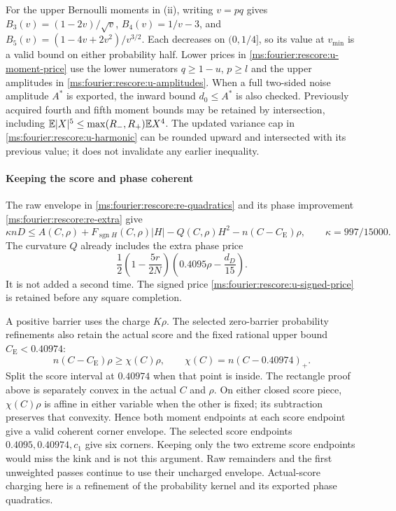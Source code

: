 For the upper Bernoulli moments in (ii), writing $v=pq$ gives
$B_3(v)=(1-2v)/\sqrt v$, $B_4(v)=1/v-3$, and
$B_5(v)=(1-4v+2v^2)/v^{3/2}$.  Each decreases on $(0,1/4]$, so its
value at $v_{\min}$ is a valid bound on either probability half.
Lower prices in \eqref{ms:fourier:rescore:u-moment-price} use the lower numerators
$q\ge1-u$, $p\ge l$ and the upper amplitudes in
\eqref{ms:fourier:rescore:u-amplitudes}.  When a full two-sided noise amplitude $A^*$ is
exported, the inward bound $d_0\le A^*$ is also checked.
Previously acquired fourth and fifth moment bounds may be retained by
intersection, including $\mathbb E|X|^5\le
\max(R_-,R_+)\mathbb E X^4$.  The updated variance cap in
\eqref{ms:fourier:rescore:u-harmonic} can be rounded upward and intersected with its
previous value; it does not invalidate any earlier inequality.

\paragraph{Keeping the score and phase coherent}\label{ms:fourier:rescore:u-phase}

The raw envelope in \eqref{ms:fourier:rescore:re-quadratics} and its phase
improvement \eqref{ms:fourier:rescore:re-extra} give
\begin{equation}\label{ms:fourier:rescore:u-conserved}
 \kappa nD\le A(C,\rho)+F_{\operatorname{sgn}H}(C,\rho)|H|
       -Q(C,\rho)H^2-n(C-C_{\mathrm E})\rho,
 \qquad\kappa=997/15000.
\end{equation}
The curvature $Q$ already includes the extra phase price
\[
 \frac12\left(1-\frac{5r}{2N}\right)
                   \left(0.4095\rho-\frac{d_D}{15}\right).
\]
It is not added a second time.  The signed price
\eqref{ms:fourier:rescore:u-signed-price} is retained before any square completion.

A positive barrier uses the charge $K\rho$.  The selected
zero-barrier probability refinements also retain the actual score and
the fixed rational upper bound $C_{\mathrm E}<0.40974$:
\begin{equation}\label{ms:fourier:rescore:u-actual-charge}
 n(C-C_{\mathrm E})\rho\ge\chi(C)\rho,
 \qquad\chi(C)=n(C-0.40974)_+.
\end{equation}
Split the score interval at $0.40974$ when that point is inside.
The rectangle proof above is separately convex in the
actual $C$ and $\rho$.  On either closed score piece,
$\chi(C)\rho$ is affine in either variable when the other is fixed;
its subtraction preserves that convexity.  Hence both moment endpoints
at each score endpoint give a valid coherent corner envelope.
The selected score endpoints $0.4095,0.40974,c_1$ give six
corners.  Keeping only the two extreme score endpoints would miss the
kink and is not this argument. Raw remainders and the first unweighted passes continue to use their
uncharged envelope.  Actual-score charging here is a refinement of the
probability kernel and its exported phase quadratics.

